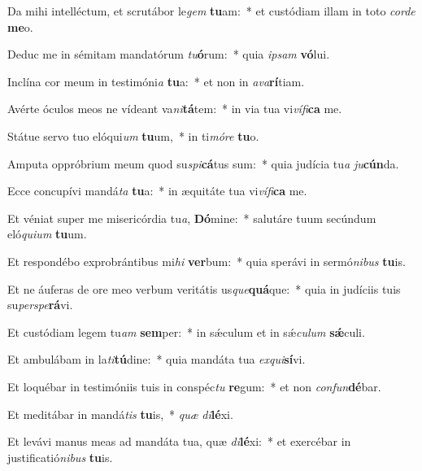\item Da mihi intelléctum, et scrutábor le\textit{gem} \textbf{tu}am:~* et custódiam illam in toto \textit{cor}\textit{de} \textbf{me}o.
\item Deduc me in sémitam mandatórum \textit{tu}\textbf{ó}rum:~* quia \textit{ip}\textit{sam} \textbf{vó}lui.
\item Inclína cor meum in testimóni\textit{a} \textbf{tu}a:~* et non in \textit{a}\textit{va}\textbf{rí}tiam.
\item Avérte óculos meos ne vídeant va\textit{ni}\textbf{tá}tem:~* in via tua vi\textit{ví}\textit{fi}\textbf{ca} me.
\item Státue servo tuo elóqui\textit{um} \textbf{tu}um,~* in ti\textit{mó}\textit{re} \textbf{tu}o.
\item Amputa oppróbrium meum quod su\textit{spi}\textbf{cá}tus sum:~* quia judícia tu\textit{a} \textit{ju}\textbf{cún}da.
\item Ecce concupívi mandá\textit{ta} \textbf{tu}a:~* in æquitáte tua vi\textit{ví}\textit{fi}\textbf{ca} me.
\item Et véniat super me misericórdia tu\textit{a}, \textbf{Dó}mine:~* salutáre tuum secúndum eló\textit{qui}\textit{um} \textbf{tu}um.
\item Et respondébo exprobrántibus mi\textit{hi} \textbf{ver}bum:~* quia sperávi in sermó\textit{ni}\textit{bus} \textbf{tu}is.
\item Et ne áuferas de ore meo verbum veritátis us\textit{que}\textbf{quá}que:~* quia in judíciis tuis su\textit{per}\textit{spe}\textbf{rá}vi.
\item Et custódiam legem tu\textit{am} \textbf{sem}per:~* in sǽculum et in sǽ\textit{cu}\textit{lum} \textbf{sǽ}culi.
\item Et ambulábam in la\textit{ti}\textbf{tú}dine:~* quia mandáta tua \textit{ex}\textit{qui}\textbf{sí}vi.
\item Et loquébar in testimóniis tuis in conspéc\textit{tu} \textbf{re}gum:~* et non \textit{con}\textit{fun}\textbf{dé}bar.
\item Et meditábar in mandá\textit{tis} \textbf{tu}is,~* \textit{quæ} \textit{di}\textbf{lé}xi.
\item Et levávi manus meas ad mandáta tua, quæ \textit{di}\textbf{lé}xi:~* et exercébar in justificatió\textit{ni}\textit{bus} \textbf{tu}is.
